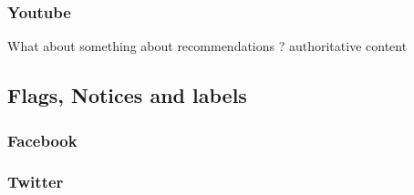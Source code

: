 \documentclass{article}
\begin{document}
\subsubsection{Youtube}

{\color{pink} What about something about recommendations ? authoritative content  }

\subsection{Flags, Notices and labels}

\subsubsection{Facebook}

\subsubsection{Twitter}
\end{document}
